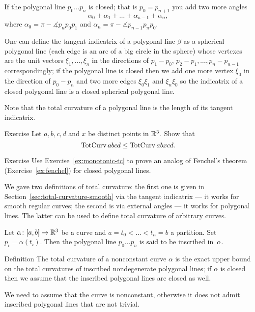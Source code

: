 If the polygonal line $p_0\dots p_n$ is closed; that is $p_0=p_{n+1}$ you add two more angles 
\[\alpha_0+\alpha_1+\dots+\alpha_{n-1} + \alpha_n ,\]
where $\alpha_0=\pi-\measuredangle p_{n}p_0p_{1}$ and $\alpha _n = \pi - \measuredangle p_{n-1} p_n p_0$.

One can define the tangent indicatrix of a polygonal line $\beta$ as a spherical polygonal line (each edge is an arc of a big circle in the sphere) whose vertexes are the unit vectors $\xi_1,\dots,\xi_n$ in the directions of $p_1-p_0$, $p_2-p_1,\dots, p_n-p_{n-1}$ correspondingly;
if the  polygonal line is closed then we add one more vertex $\xi_0$ in the direction of $p_0-p_{n}$ and two more edges $\xi_0\xi_1$ and $\xi_n\xi_0$ so the indicatrix of a closed polygonal line is a closed spherical polygonal line.

Note that the total curvature of a polygonal line is the length of its tangent indicatrix.

\begin{thm}{Exercise}\label{ex:monotonic-tc}
Let $a,b,c,d$ and $x$ be distinct points in $\mathbb{R}^3$.
Show that 
\[\mathop{\rm TotCurv}\nolimits abcd \leq \mathop{\rm TotCurv}\nolimits abxcd.\]
\end{thm}

\begin{thm}{Exercise}\label{ex:poly-fenchel}
Use Exercise~\ref{ex:monotonic-tc} to prove an analog of Fenchel's theorem (Exercise~\ref{ex:fenchel}) for closed polygonal lines.
\end{thm}


We gave two definitions of total curvature:
the first one is given in Section~\ref{sec:total-curvature-smooth} via the tangent indicatrix --- it works for smooth regular curves;
the second is via external angles --- it works for polygonal lines.
The latter can be used to define total curvature of arbitrary curves.


Let  $\alpha\colon[a,b]\to \mathbb{R}^3$ be a curve and  $a=t_0<\dots<t_n=b$ a partition.
Set $p_i=\alpha(t_i)$.
Then the polygonal line $p_0\dots p_n$ is said to be inscribed in~$\alpha$. 

\begin{thm}{Definition}\label{def:total-curv-poly}
The total curvature of a nonconstant curve $\alpha$ is the exact upper bound on the total curvatures of inscribed nondegenerate polygonal lines;
if $\alpha$ is closed then we assume that the inscribed polygonal lines are closed as well.
\end{thm}

We need to assume that the curve is nonconstant, otherwise it does not admit inscribed polygonal lines that are not trivial.

